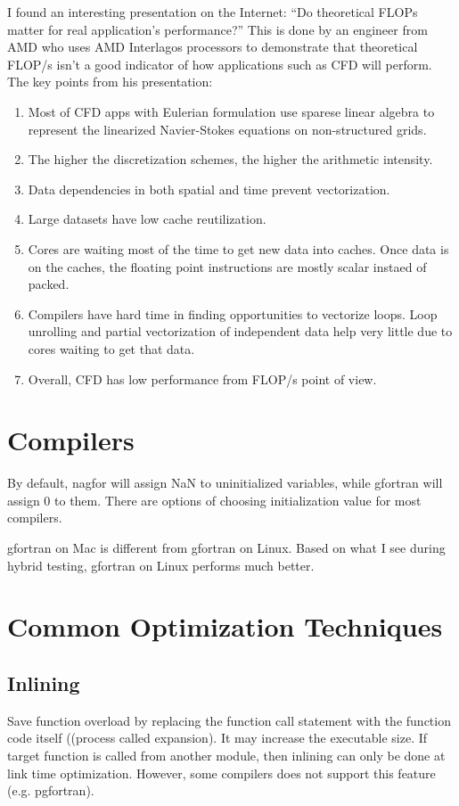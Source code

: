 \documentclass[11pt]{book} %
\begin{document}
I found an interesting presentation on the Internet: ``Do theoretical FLOPs matter for real application's performance?'' This is done by an engineer from AMD who uses AMD Interlagos processors to demonstrate that theoretical FLOP/s isn't a good indicator of how applications such as CFD will perform. The key points from his presentation:
\begin{enumerate}
\item Most of CFD apps with Eulerian formulation use sparese linear algebra to represent the linearized Navier-Stokes equations on non-structured grids.
\item The higher the discretization schemes, the higher the arithmetic intensity.
\item Data dependencies in both spatial and time prevent vectorization.
\item Large datasets have low cache reutilization.
\item Cores are waiting most of the time to get new data into caches. Once data is on the caches, the floating point instructions are mostly scalar instaed of packed.
\item Compilers have hard time in finding opportunities to vectorize loops. Loop unrolling and partial vectorization of independent data help very little due to cores waiting to get that data.
\item Overall, CFD has low performance from FLOP/s point of view.
\end{enumerate}


\section{Compilers}
By default, nagfor will assign NaN to uninitialized variables, while gfortran will assign 0 to them. There are options of choosing initialization value for most compilers.

gfortran on Mac is different from gfortran on Linux. Based on what I see during hybrid testing, gfortran on Linux performs much better.

\section{Common Optimization Techniques}

\subsection{Inlining}
Save function overload by replacing the function call statement with the function code itself ((process called expansion).
It may increase the executable size. If target function is called from another module, then inlining can only be done at link time optimization. However, some compilers does not support this feature (e.g. pgfortran).
\end{document}
